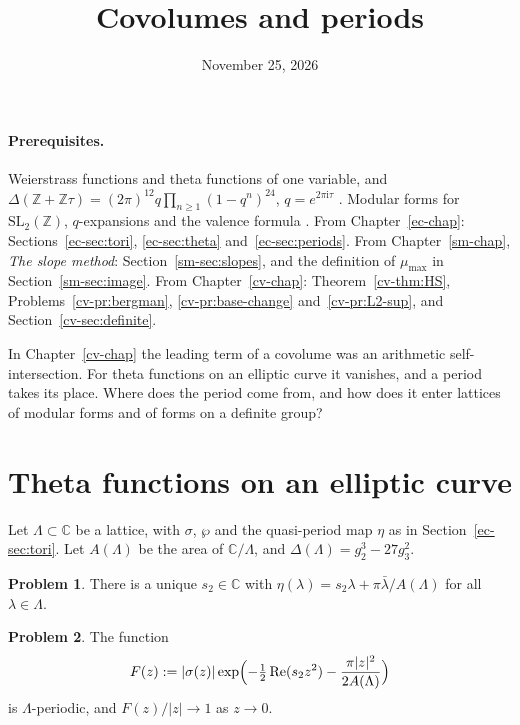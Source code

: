\documentclass[reqno]{amsart}
\title{Covolumes and periods}
\author{}
\date{November 25, 2026}
\newcounter{chap}
\theoremstyle{definition}
\newtheorem{problem}{Problem}[section]
\theoremstyle{plain}
\newcommand{\Z}{\mathbb{Z}}
\newcommand{\C}{\mathbb{C}}
\newcommand{\ii}{\mathrm{i}}
\newcommand{\mumax}{\mu_{\max}}
\begin{document}
\maketitle
{}\label{chap}

\paragraph{Prerequisites.}
Weierstrass functions and theta functions of one variable, and \(\Delta(\Z + \Z\tau) = (2\pi)^{12}q\prod_{n \ge 1}(1 - q^n)^{24}\), \(q = e^{2\pi\ii\tau}\) \cite[\S VII.4.4]{SeA}.  Modular forms for \(\mathrm{SL}_2(\Z)\), \(q\)-expansions and the valence formula \cite[Ch.~VII]{SeA}.  From Chapter~\ref{ec-chap}: Sections~\ref{ec-sec:tori}, \ref{ec-sec:theta} and~\ref{ec-sec:periods}.  From Chapter~\ref{sm-chap}, \emph{The slope method}: Section~\ref{sm-sec:slopes}, and the definition of \(\mumax\) in Section~\ref{sm-sec:image}.  From Chapter~\ref{cv-chap}: Theorem~\ref{cv-thm:HS}, Problems~\ref{cv-pr:bergman}, \ref{cv-pr:base-change} and~\ref{cv-pr:L2-sup}, and Section~\ref{cv-sec:definite}.

In Chapter~\ref{cv-chap} the leading term of a covolume was an arithmetic self-intersection.  For theta functions on an elliptic curve it vanishes, and a period takes its place.  Where does the period come from, and how does it enter lattices of modular forms and of forms on a definite group?

\section{Theta functions on an elliptic curve}\label{sec:theta}

Let \(\Lambda \subset \C\) be a lattice, with \(\sigma\), \(\wp\) and the quasi-period map \(\eta\) as in Section~\ref{ec-sec:tori}.  Let \(A(\Lambda)\) be the area of \(\C/\Lambda\), and \(\Delta(\Lambda) = g_2^3 - 27g_3^2\).

\begin{problem}\label{pr:s2}
There is a unique \(s_2 \in \C\) with \(\eta(\lambda) = s_2\lambda + \pi\bar\lambda/A(\Lambda)\) for all \(\lambda \in \Lambda\).
\end{problem}

\begin{problem}\label{pr:F}
The function
\[
  F(z) := \lvert \sigma(z) \rvert \exp\Bigl( -\tfrac12 \operatorname{Re}(s_2 z^2) - \frac{\pi \lvert z \rvert^2}{2A(\Lambda)} \Bigr)
\]
is \(\Lambda\)-periodic, and \(F(z)/\lvert z \rvert \to 1\) as \(z \to 0\).
\end{problem}
\end{document}
